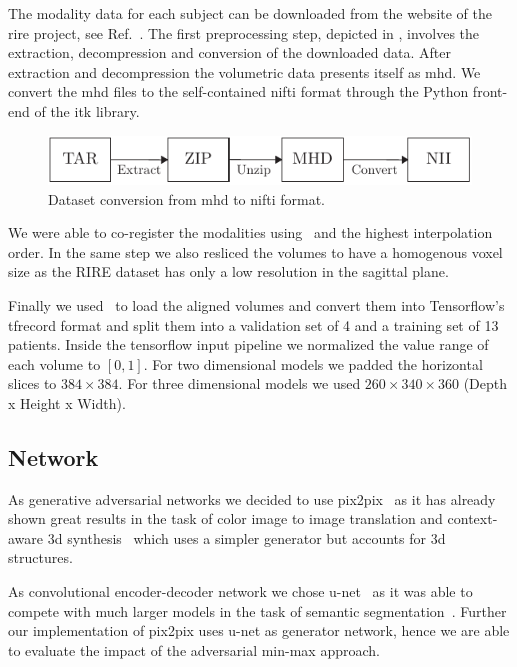 The modality data for each subject can be downloaded from the website of the
\gls{rire} project, see Ref.~\cite{RIRE}. The first preprocessing step,
depicted in , involves the extraction, decompression and
conversion of the downloaded data. After extraction and decompression the
volumetric data presents itself as \gls{mhd}. We convert the \gls{mhd} files
to the self-contained \gls{nifti} format through the Python front-end of the
\gls{itk} library. 
\begin{figure}[h]
  \centering
  \includegraphics[width=\linewidth]{figure/conversion.pdf}
  \caption{Dataset conversion from \gls{mhd} to \gls{nifti} format.
	}\label{fig:conversion}
\end{figure}
We were able to co-register the modalities using~\cite{SPM12} and the
highest interpolation order. In the same step we also resliced the volumes
to have a homogenous voxel size as the RIRE dataset has only a low resolution
in the sagittal plane.


Finally we used~\cite{Nibabel} to load the aligned volumes and convert them
into Tensorflow's tfrecord format and split them into a validation set of
4 and a training set of 13 patients. Inside the tensorflow input pipeline
we normalized the value range of each volume to $[0,1]$. For two dimensional
models we padded the horizontal slices to $384\times384$. For three
dimensional models we used $260\times340\times360$ (Depth x Height x Width).

\subsection{Network}

As generative adversarial networks we decided to use pix2pix~\cite{Isola16}
as it has already shown great results in the task of color image to image
translation and context-aware 3d synthesis~\cite{Nie16} which uses a simpler
generator but accounts for 3d structures.

As convolutional encoder-decoder network we chose u-net~\cite{Ronneberger15}
as it was able to compete with much larger models in the task of semantic
segmentation~\cite{Badrinarayanan15}. Further our implementation of pix2pix
uses u-net as generator network, hence we are able to evaluate the impact
of the adversarial min-max approach.

